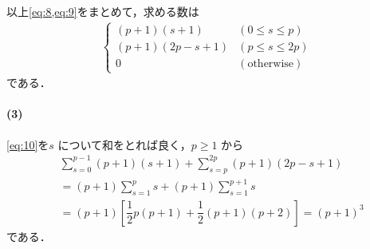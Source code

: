 \documentclass[../../main.tex]{subfiles}
\begin{document}
以上\cref{eq:8,eq:9}をまとめて，求める数は
\begin{align}
  \begin{cases}
    (p+1)(s+1) & (0 \le s \le p) \\
    (p+1)(2p-s+1) & (p \le s \le 2p) \\
    0 & (\text{otherwise})
  \end{cases} \label{eq:10}
\end{align}
である．

\paragraph{(3)}

\cref{eq:10}を$s$ について和をとれば良く，$p \ge 1$ から
\begin{align}
  &\sum_{s=0}^{p-1} (p+1)(s+1) + \sum_{s=p}^{2p} (p+1)(2p-s+1) \\
  &= (p+1) \sum_{s=1}^{p} s + (p+1) \sum_{s=1}^{p+1} s \\
  &= (p+1) \left[ \dfrac{1}{2}p(p+1) + \dfrac{1}{2}(p+1)(p+2) \right] = (p+1)^3
\end{align}
である．
\end{document}
